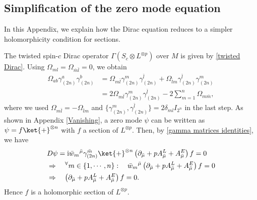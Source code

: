 \documentclass[12pt]{article}
\newcommand{\im}{\mathrm{i}}
\theoremstyle{definition} %
\theoremstyle{plain} %
\theoremstyle{remark} %
\theoremstyle{underline}
\begin{document}
\subsection{Simplification of the zero mode equation}
\label{simplification}

In this Appendix, we explain how the Dirac equation reduces to a simpler
holomorphicity condition for sections.

The twisted spin-$c$ Dirac operator $\Gamma(S_c \otimes L^{\otimes p})$ over $M$
is given by \eqref{twisted Dirac}.
Using $\Omega_{ml} = \Omega_{\bar{m} \bar{l}} = 0$, we obtain
\begin{align}
\Omega_{ab} \gamma_{(2n)}^a \gamma_{(2n)}^b
&= \Omega_{m \bar{l}} \gamma_{(2n)}^m \gamma_{(2n)}^{\bar l}
+ \Omega_{\bar{l} m} \gamma_{(2n)}^{\bar l} \gamma_{(2n)}^m \nonumber \\
&= 2 \Omega_{m \bar{l}} \gamma_{(2n)}^m \gamma_{(2n)}^{\bar l}
-2 \sum_{m=1}^n \Omega_{m \bar{m}},
\end{align}
where we used $\Omega_{m \bar{l}} = - \Omega_{\bar{l} m}$ and
$\{\gamma_{(2n)}^m ,\gamma_{(2n)}^{\bar l}\} = 2\delta_{ml} I_{2^n}$ in the last
step.
As shown in Appendix \ref{Vanishing}, a zero mode $\psi$ can be written as
$\psi = f \ket{+}^{\otimes n}$ with $f$ a section of $L^{\otimes p}$.
Then, by \eqref{gamma matrices identities}, we have
\begin{align}
&D\psi = \im  \bar{w}_m{}^{\bar{\mu}} \gamma_{(2n)}^{\bar{m}}\ket{+}^{\otimes n} \left(\partial_{\bar{\mu}} + p A^L_{\bar \mu} + A^E_{\bar \mu} \right) f = 0 \nonumber \\
& \Rightarrow \quad {}^{\forall} m \in \{1,\cdots, n\}: \quad  \bar{w}_m {}^{\bar{\mu}} \left(\partial_{\bar{\mu}} + p A^L_{\bar \mu} + A^E_{\bar \mu} \right) f = 0 \nonumber \\
& \Rightarrow \quad \left(\partial_{\bar{\mu}} + p A^L_{\bar \mu} + A^E_{\bar \mu} \right) f = 0.
\end{align}
Hence $f$ is a holomorphic section of $L^{\otimes p}$.














\end{document}
